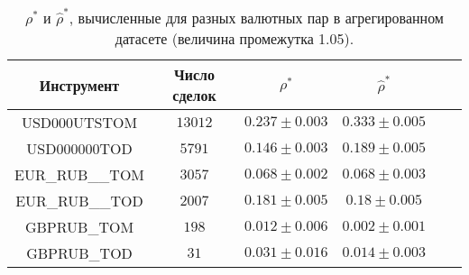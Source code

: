 \begin{table}[h!]
    \begin{center}
        \begin{tabular}{|c|c|c|c|c|c|}
            \hline
            Инструмент      & Число сделок & $\rho^*$ & $\hat \rho^*$            \\ \hline
            USD000UTSTOM    & $13012$ & $0.237 \pm 0.003$ & $0.333 \pm 0.005$ \\ \hline
            USD000000TOD    & $5791$  & $0.146 \pm 0.003$ & $0.189 \pm 0.005$ \\ \hline
            EUR\_RUB\_\_TOM & $3057$  & $0.068 \pm 0.002$ & $0.068 \pm 0.003$ \\ \hline
            EUR\_RUB\_\_TOD & $2007$  & $0.181 \pm 0.005$ & $0.18 \pm 0.005$  \\ \hline
            GBPRUB\_TOM     & $198$   & $0.012 \pm 0.006$ & $0.002 \pm 0.001$ \\ \hline
            GBPRUB\_TOD     & $31$    & $0.031 \pm 0.016$ & $0.014 \pm 0.003$ \\ \hline
        \end{tabular}
    \end{center}
    \caption{$\rho^*$ и $\hat \rho^*$, вычисленные для разных валютных пар в агрегированном датасете (величина промежутка 1.05).}
    \label{Aggreg1CU}
\end{table}

